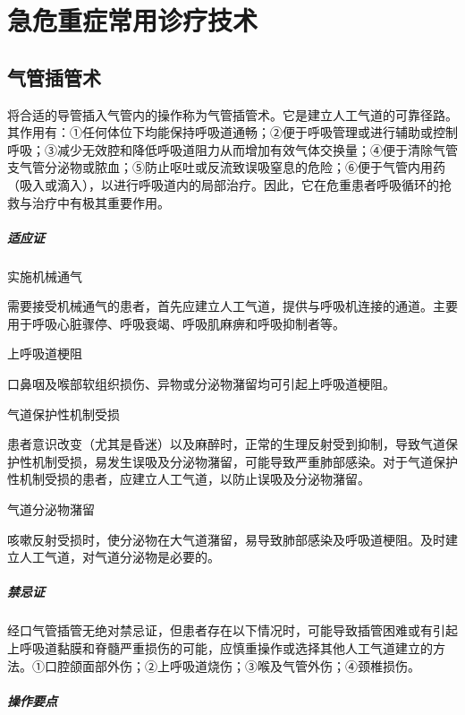 \part{急危重症常用诊疗技术}

\chapter{气管插管术}

将合适的导管插入气管内的操作称为气管插管术。它是建立人工气道的可靠径路。其作用有：①任何体位下均能保持呼吸道通畅；②便于呼吸管理或进行辅助或控制呼吸；③减少无效腔和降低呼吸道阻力从而增加有效气体交换量；④便于清除气管支气管分泌物或脓血；⑤防止呕吐或反流致误吸窒息的危险；⑥便于气管内用药（吸入或滴入），以进行呼吸道内的局部治疗。因此，它在危重患者呼吸循环的抢救与治疗中有极其重要作用。

\subsubsection{适应证}

\subparagraph{实施机械通气}

需要接受机械通气的患者，首先应建立人工气道，提供与呼吸机连接的通道。主要用于呼吸心脏骤停、呼吸衰竭、呼吸肌麻痹和呼吸抑制者等。

\subparagraph{上呼吸道梗阻}

口鼻咽及喉部软组织损伤、异物或分泌物潴留均可引起上呼吸道梗阻。

\subparagraph{气道保护性机制受损}

患者意识改变（尤其是昏迷）以及麻醉时，正常的生理反射受到抑制，导致气道保护性机制受损，易发生误吸及分泌物潴留，可能导致严重肺部感染。对于气道保护性机制受损的患者，应建立人工气道，以防止误吸及分泌物潴留。

\subparagraph{气道分泌物潴留}

咳嗽反射受损时，使分泌物在大气道潴留，易导致肺部感染及呼吸道梗阻。及时建立人工气道，对气道分泌物是必要的。

\subsubsection{禁忌证}

经口气管插管无绝对禁忌证，但患者存在以下情况时，可能导致插管困难或有引起上呼吸道黏膜和脊髓严重损伤的可能，应慎重操作或选择其他人工气道建立的方法。①口腔颌面部外伤；②上呼吸道烧伤；③喉及气管外伤；④颈椎损伤。

\subsubsection{操作要点}


